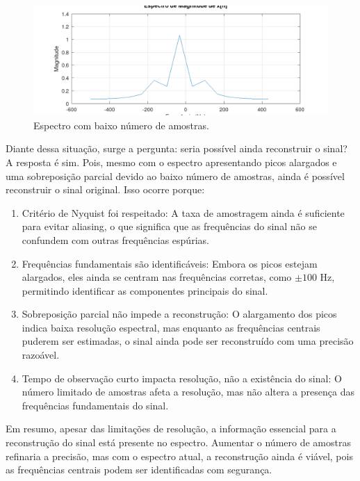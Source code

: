 \begin{figure}[H]
    \centering
    \includegraphics[width=1\linewidth]{03_results/assets/aliasing.png}
    \caption{Espectro com baixo número de amostras.}
    \label{fig:sim-low-sampling}
\end{figure}

Diante dessa situação, surge a pergunta: seria possível ainda reconstruir o sinal? A resposta é sim. Pois, mesmo com o espectro apresentando picos alargados e uma sobreposição parcial devido ao baixo número de amostras, ainda é possível reconstruir o sinal original. Isso ocorre porque:

\begin{enumerate}
    \item Critério de Nyquist foi respeitado: A taxa de amostragem ainda é suficiente para evitar aliasing, o que significa que as frequências do sinal não se confundem com outras frequências espúrias.
    \item Frequências fundamentais são identificáveis: Embora os picos estejam alargados, eles ainda se centram nas frequências corretas, como $\pm 100$ Hz, permitindo identificar as componentes principais do sinal.
    \item Sobreposição parcial não impede a reconstrução: O alargamento dos picos indica baixa resolução espectral, mas enquanto as frequências centrais puderem ser estimadas, o sinal ainda pode ser reconstruído com uma precisão razoável.
    \item Tempo de observação curto impacta resolução, não a existência do sinal: O número limitado de amostras afeta a resolução, mas não altera a presença das frequências fundamentais do sinal.
\end{enumerate}

Em resumo, apesar das limitações de resolução, a informação essencial para a reconstrução do sinal está presente no espectro. Aumentar o número de amostras refinaria a precisão, mas com o espectro atual, a reconstrução ainda é viável, pois as frequências centrais podem ser identificadas com segurança.


